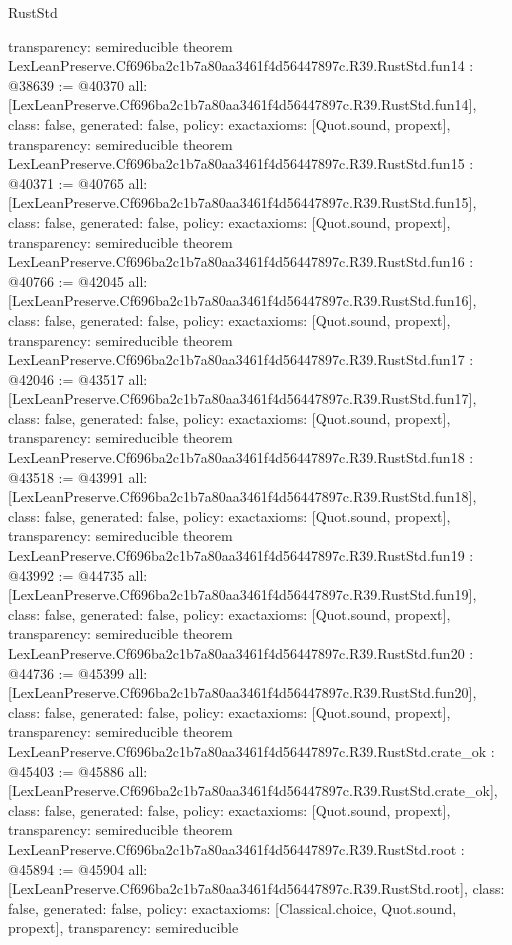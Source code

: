 \begin{lexlean}{RustStd}
\begin{coremodule}
{  transparency: semireducible
}
theorem LexLeanPreserve.Cf696ba2c1b7a80aa3461f4d56447897c.R39.RustStd.fun14 : @38639 := @40370 {
  all: [LexLeanPreserve.Cf696ba2c1b7a80aa3461f4d56447897c.R39.RustStd.fun14],
  class: false,
  generated: false,
  policy: exact{axioms: [Quot.sound, propext]},
  transparency: semireducible
}
theorem LexLeanPreserve.Cf696ba2c1b7a80aa3461f4d56447897c.R39.RustStd.fun15 : @40371 := @40765 {
  all: [LexLeanPreserve.Cf696ba2c1b7a80aa3461f4d56447897c.R39.RustStd.fun15],
  class: false,
  generated: false,
  policy: exact{axioms: [Quot.sound, propext]},
  transparency: semireducible
}
theorem LexLeanPreserve.Cf696ba2c1b7a80aa3461f4d56447897c.R39.RustStd.fun16 : @40766 := @42045 {
  all: [LexLeanPreserve.Cf696ba2c1b7a80aa3461f4d56447897c.R39.RustStd.fun16],
  class: false,
  generated: false,
  policy: exact{axioms: [Quot.sound, propext]},
  transparency: semireducible
}
theorem LexLeanPreserve.Cf696ba2c1b7a80aa3461f4d56447897c.R39.RustStd.fun17 : @42046 := @43517 {
  all: [LexLeanPreserve.Cf696ba2c1b7a80aa3461f4d56447897c.R39.RustStd.fun17],
  class: false,
  generated: false,
  policy: exact{axioms: [Quot.sound, propext]},
  transparency: semireducible
}
theorem LexLeanPreserve.Cf696ba2c1b7a80aa3461f4d56447897c.R39.RustStd.fun18 : @43518 := @43991 {
  all: [LexLeanPreserve.Cf696ba2c1b7a80aa3461f4d56447897c.R39.RustStd.fun18],
  class: false,
  generated: false,
  policy: exact{axioms: [Quot.sound, propext]},
  transparency: semireducible
}
theorem LexLeanPreserve.Cf696ba2c1b7a80aa3461f4d56447897c.R39.RustStd.fun19 : @43992 := @44735 {
  all: [LexLeanPreserve.Cf696ba2c1b7a80aa3461f4d56447897c.R39.RustStd.fun19],
  class: false,
  generated: false,
  policy: exact{axioms: [Quot.sound, propext]},
  transparency: semireducible
}
theorem LexLeanPreserve.Cf696ba2c1b7a80aa3461f4d56447897c.R39.RustStd.fun20 : @44736 := @45399 {
  all: [LexLeanPreserve.Cf696ba2c1b7a80aa3461f4d56447897c.R39.RustStd.fun20],
  class: false,
  generated: false,
  policy: exact{axioms: [Quot.sound, propext]},
  transparency: semireducible
}
theorem LexLeanPreserve.Cf696ba2c1b7a80aa3461f4d56447897c.R39.RustStd.crate_ok : @45403 := @45886 {
  all: [LexLeanPreserve.Cf696ba2c1b7a80aa3461f4d56447897c.R39.RustStd.crate_ok],
  class: false,
  generated: false,
  policy: exact{axioms: [Quot.sound, propext]},
  transparency: semireducible
}
theorem LexLeanPreserve.Cf696ba2c1b7a80aa3461f4d56447897c.R39.RustStd.root : @45894 := @45904 {
  all: [LexLeanPreserve.Cf696ba2c1b7a80aa3461f4d56447897c.R39.RustStd.root],
  class: false,
  generated: false,
  policy: exact{axioms: [Classical.choice, Quot.sound, propext]},
  transparency: semireducible
}


\end{coremodule}
\end{lexlean}
